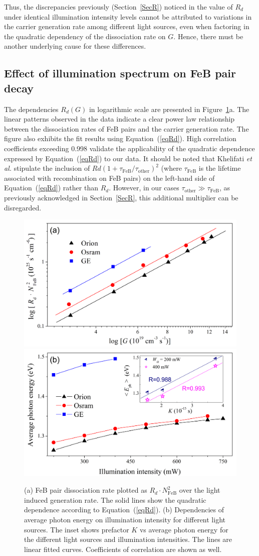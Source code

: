 \documentclass{WileyMSP-template}
\begin{document}
Thus, the discrepancies previously (Section~\ref{SecR}) noticed  in the value of $R_d$ under identical illumination intensity levels 
cannot be attributed to variations in the carrier generation rate among different light sources, 
even when factoring in the quadratic dependency of the dissociation rate on $G$. 
Hence, there must be another underlying cause for these differences.


\subsection{Effect of illumination spectrum on FeB pair decay}\label{SecLast}

The dependencies $R_d (G)$ in logarithmic scale are presented in Figure~\ref{fig6}a. 
The linear patterns observed in the data indicate a clear power law relationship between 
the dissociation rates of FeB pairs and the carrier generation rate. 
The figure also exhibits the fit results using Equation~(\ref{eqRd}). 
High correlation coefficients exceeding 0.998 validate the applicability of the quadratic dependence expressed by Equation~(\ref{eqRd}) to our data. 
It should be noted that Khelifati \emph{et al.} \cite{FeBKin2019} stipulate the inclusion of 
$Rd\left(1+\tau_\mathrm{FeB}/\tau_\mathrm{other}\right)^2$ (where $\tau_\mathrm{FeB}$ is the lifetime associated with recombination on FeB pairs)
on the left-hand side of Equation~(\ref{eqRd}) rather than $R_d$. 
However, in our cases $\tau_\mathrm{other}\gg \tau_\mathrm{FeB}$, as previously acknowledged in Section~\ref{SecR}, 
this additional multiplier can be disregarded.


\begin{figure}
\centering
  \includegraphics[width=0.4\linewidth]{Fig6a.png}
  \includegraphics[width=0.4\linewidth]{Fig6b.png}
  \caption{
  (a) FeB pair dissociation rate plotted as $R_d\cdot N_\mathrm{FeB}^2$ over the light induced
  generation rate. The solid lines show the quadratic dependence according to Equation~(\ref{eqRd}).
  (b) Dependencies of average photon energy on illumination intensity for different light sources.
  The inset shows prefactor $K$ vs average photon energy for the different light sources and illumination intensities.
  The lines are linear fitted curves. Coefficients of correlation are shown as well.
  }
  \label{fig6}
\end{figure}
\end{document}
